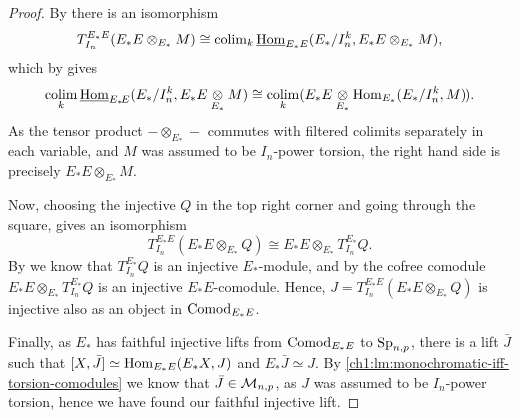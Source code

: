 \begin{proof}
    By \cite[5.5]{barthel-heard-valenzuela_2018} there is an isomorphism
    \[T^{E_*E}_{I_n} (E_*E\otimes_{E_*}M) \cong \operatorname{colim}_k \operatorname{\underline{Hom}}_{E_*E}(E_*/I_n^k, E_*E\otimes_{E_*}M),\]
    which by \cite[4.4]{barthel-heard-valenzuela_2018} gives
    \[\underset{k}{\operatorname{colim}} \operatorname{\underline{Hom}}_{E_* \! E}(E_*/I_n^k, E_* E\underset{E_*}\otimes M) \cong \underset{k}{\operatorname{colim}} (E_* E \underset{E_*}\otimes \operatorname{Hom}_{E_*}(E_*/I_n^k, M)\hspace{-1pt}).\]
    As the tensor product $-\otimes_{E_*}-$ commutes with filtered colimits separately in each variable, and $M$ was assumed to be $I_n$-power torsion, the right hand side is precisely $E_*E\otimes_{E_*}M$.    
    
    Now, choosing the injective $Q$ in the top right corner and going through the square, gives an isomorphism 
    \[T^{E_*E}_{I_n}(E_*E\otimes_{E_*}Q)\cong E_*E\otimes_{E_*}T_{I_n}^{E_*}Q.\] 
    By \cite[2.1.4]{brodmann-sharp_1998} we know that $T^{E_*}_{I_n}Q$ is an injective $E_*$-module, and by \cite[2.1(a)]{hovey-strickland_2005b} the cofree comodule $E_*E\otimes_{E_*} T^{E_*}_{I_n}Q$ is an injective $E_*E$-comodule. Hence, $J=T^{E_*E}_{I_n}(E_*E\otimes_{E_*}Q)$ is injective also as an object in $\mathrm{Comod}_{E_*E}$.

    Finally, as $E_*$ has faithful injective lifts from $\mathrm{Comod}_{E_*E}$ to $\mathrm{Sp}_{n,p}$, there is a lift $\bar{J}$ such that $[X,\bar{J}]\simeq \operatorname{Hom}_{E_*E}(E_*X, J)$ and $E_*\bar{J}\simeq J$. By \cref{ch1:lm:monochromatic-iff-torsion-comodules} we know that $\bar{J}\in \mathcal{M}_{n,p}$, as $J$ was assumed to be $I_n$-power torsion, hence we have found our faithful injective lift. 
\end{proof}

